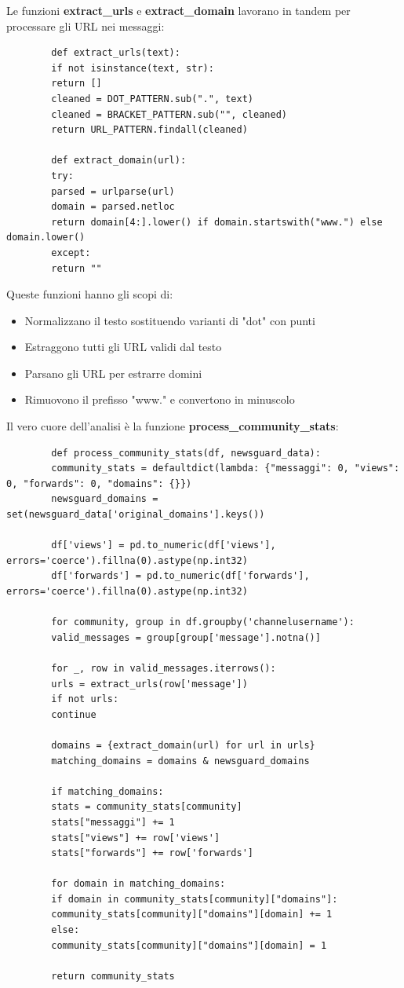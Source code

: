 \documentclass[12pt]{article}
\begin{document}
	Le funzioni \textbf{extract\_urls} e \textbf{extract\_domain} lavorano in tandem per processare gli URL nei messaggi:
	\begin{lstlisting}
		def extract_urls(text):
		if not isinstance(text, str):
		return []
		cleaned = DOT_PATTERN.sub(".", text)
		cleaned = BRACKET_PATTERN.sub("", cleaned)
		return URL_PATTERN.findall(cleaned)
		
		def extract_domain(url):
		try:
		parsed = urlparse(url)
		domain = parsed.netloc
		return domain[4:].lower() if domain.startswith("www.") else domain.lower()
		except:
		return ""
	\end{lstlisting}
	Queste funzioni hanno gli scopi di:
	\begin{itemize}[label=]
		\item Normalizzano il testo sostituendo varianti di "dot" con punti
		\item Estraggono tutti gli URL validi dal testo
		\item Parsano gli URL per estrarre domini
		\item Rimuovono il prefisso "www." e convertono in minuscolo
	\end{itemize}
	Il vero cuore dell'analisi è la funzione \textbf{process\_community\_stats}:
	\begin{lstlisting}
		def process_community_stats(df, newsguard_data):
		community_stats = defaultdict(lambda: {"messaggi": 0, "views": 0, "forwards": 0, "domains": {}})
		newsguard_domains = set(newsguard_data['original_domains'].keys())
		
		df['views'] = pd.to_numeric(df['views'], errors='coerce').fillna(0).astype(np.int32)
		df['forwards'] = pd.to_numeric(df['forwards'], errors='coerce').fillna(0).astype(np.int32)
		
		for community, group in df.groupby('channelusername'):
		valid_messages = group[group['message'].notna()]
		
		for _, row in valid_messages.iterrows():
		urls = extract_urls(row['message'])
		if not urls:
		continue
		
		domains = {extract_domain(url) for url in urls}
		matching_domains = domains & newsguard_domains
		
		if matching_domains:
		stats = community_stats[community]
		stats["messaggi"] += 1
		stats["views"] += row['views']
		stats["forwards"] += row['forwards']
		
		for domain in matching_domains:
		if domain in community_stats[community]["domains"]:
		community_stats[community]["domains"][domain] += 1
		else:
		community_stats[community]["domains"][domain] = 1
		
		return community_stats
	\end{lstlisting}
\end{document}
